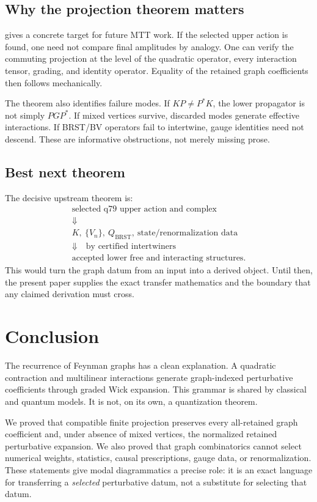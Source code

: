 \documentclass[11pt,a4paper]{article}
\newcommand{\BRST}{\mathrm{BRST}}
\begin{document}
\subsection{Why the projection theorem matters}

 gives a concrete target for future MTT work.  If the
selected upper action is found, one need not compare final amplitudes by
analogy.  One can verify the commuting projection at the level of the
quadratic operator, every interaction tensor, grading, and identity
operator.  Equality of the retained graph coefficients then follows
mechanically.

The theorem also identifies failure modes. If \(KP\ne P^*K\),
the lower propagator is not simply \(PGP^*\). If mixed vertices
survive, discarded modes generate effective interactions.  If BRST/BV
operators fail to intertwine, gauge identities need not descend.  These
are informative obstructions, not merely missing prose.

\subsection{Best next theorem}

The decisive upstream theorem is:
\[
\begin{gathered}
\text{selected q79 upper action and complex}\\
\Downarrow\\
K,\ \{V_n\},\ Q_{\BRST},\ \text{state/renormalization data}\\
\Downarrow\quad\text{by certified intertwiners}\\
\text{accepted lower free and interacting structures}.
\end{gathered}
\]
This would turn the graph datum from an input into a derived object.  Until
then, the present paper supplies the exact transfer mathematics and the
boundary that any claimed derivation must cross.

\section{Conclusion}

The recurrence of Feynman graphs has a clean explanation.  A quadratic
contraction and multilinear interactions generate graph-indexed
perturbative coefficients through graded Wick expansion.  This grammar is
shared by classical and quantum models.  It is not, on its own, a
quantization theorem.

We proved that compatible finite projection preserves every all-retained
graph coefficient and, under absence of mixed vertices, the normalized
retained perturbative expansion.  We also proved that graph combinatorics
cannot select numerical weights, statistics, causal prescriptions, gauge
data, or renormalization.  These statements give modal diagrammatics a
precise role: it is an exact language for transferring a \emph{selected}
perturbative datum, not a substitute for selecting that datum.
\end{document}

